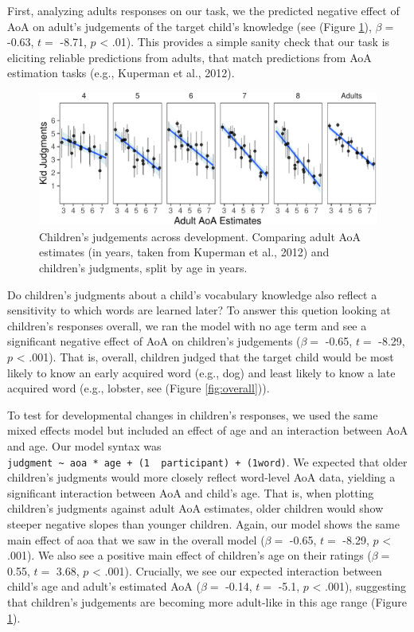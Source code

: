 \documentclass[10pt, letterpaper]{article}
\newenvironment{CodeChunk}{}{}
\begin{document}
First, analyzing adults responses on our task, we the predicted negative
effect of AoA on adult's judgements of the target child's knowledge (see
(Figure \ref{fig:development}), \(\beta =\) -0.63, \(t =\) -8.71, \(p\)
\textless{} .01). This provides a simple sanity check that our task is
eliciting reliable predictions from adults, that match predictions from
AoA estimation tasks (e.g., Kuperman et al., 2012).

\begin{CodeChunk}
\begin{figure}[tb]
\includegraphics{figs/development-1} \caption[Children’s judgements across development]{Children’s judgements across development. Comparing adult AoA estimates (in years, taken from Kuperman et al., 2012) and children’s judgments, split by age in years.}\label{fig:development}
\end{figure}
\end{CodeChunk}

Do children's judgments about a child's vocabulary knowledge also
reflect a sensitivity to which words are learned later? To answer this
quetion looking at children's responses overall, we ran the model with
no age term and see a significant negative effect of AoA on children's
judgements (\(\beta =\) -0.65, \(t =\) -8.29, \(p\) \textless{} .001).
That is, overall, children judged that the target child would be most
likely to know an early acquired word (e.g., dog) and least likely to
know a late acquired word (e.g., lobster, see (Figure
\ref{fig:overall})).

To test for developmental changes in children's responses, we used the
same mixed effects model but included an effect of age and an
interaction between AoA and age. Our model syntax was
\texttt{judgment\ \textasciitilde{}\ aoa\ *\ age\ +\ (1\ \textbar{}\ participant)\ +\ (1\textbar{}word)}.
We expected that older children's judgments would more closely reflect
word-level AoA data, yielding a significant interaction between AoA and
child's age. That is, when plotting children's judgments against adult
AoA estimates, older children would show steeper negative slopes than
younger children. Again, our model shows the same main effect of aoa
that we saw in the overall model (\(\beta =\) -0.65, \(t =\) -8.29,
\(p\) \textless{} .001). We also see a positive main effect of
children's age on their ratings (\(\beta =\) 0.55, \(t =\) 3.68, \(p\)
\textless{} .001). Crucially, we see our expected interaction between
child's age and adult's estimated AoA (\(\beta =\) -0.14, \(t =\) -5.1,
\(p\) \textless{} .001), suggesting that children's judgements are
becoming more adult-like in this age range (Figure
\ref{fig:development}).
\end{document}
